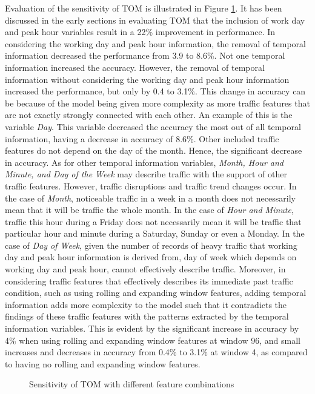 Evaluation of the sensitivity of TOM is illustrated in Figure \ref{fig:TOM_sensitivity}. It has been discussed in the early sections in evaluating TOM that the inclusion of work day and peak hour variables result in a 22\% improvement in performance. In considering the working day and peak hour information, the removal of temporal information decreased the performance from 3.9 to 8.6\%. Not one temporal information increased the accuracy. However, the removal of temporal information without considering the working day and peak hour information increased the performance, but only by 0.4 to 3.1\%. This change in accuracy can be because of the model being given more complexity as more traffic features that are not exactly strongly connected with each other. An example of this is the variable \textit{Day}. This variable decreased the accuracy the most out of all temporal information, having a decrease in accuracy of 8.6\%. Other included traffic features do not depend on the day of the month. Hence, the significant decrease in accuracy. As for other temporal information variables, \textit{Month, Hour and Minute, and Day of the Week} may describe traffic with the support of other traffic features. However, traffic disruptions and traffic trend changes occur. In the case of \textit{Month}, noticeable traffic in a week in a month does not necessarily mean that it will be traffic the whole month. In the case of \textit{Hour and Minute}, traffic this hour during a Friday does not necessarily mean it will be traffic that particular hour and minute during a Saturday, Sunday or even a Monday. In the case of \textit{Day of Week}, given the number of records of heavy traffic that working day and peak hour information is derived from, day of week which depends on working day and peak hour, cannot effectively describe traffic. Moreover, in considering traffic features that effectively describes its immediate past traffic condition, such as using rolling and expanding window features, adding temporal information adds more complexity to the model such that it contradicts the findings of these traffic features with the patterns extracted by the temporal information variables. This is evident by the significant increase in accuracy by 4\% when using rolling and expanding window features at window 96, and small increases and decreases in accuracy from 0.4\% to 3.1\% at window 4, as compared to having no rolling and expanding window features. 

\begin{figure}[!t]
  \centering
  \captionsetup{justification=centering}
  \caption{Sensitivity of TOM with different feature combinations}
  \label{fig:TOM_sensitivity}
\end{figure}

